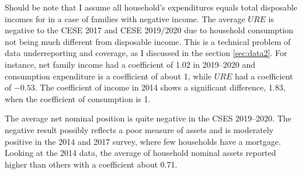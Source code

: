 \documentclass[11pt,letterpaper]{article}
\begin{document}
Should be note that I assume all household's expenditures equals total disposable incomes for in a case of families with negative income. The average $URE$ is negative to the CESE 2017 and CESE 2019/2020 due to household consumption not being much different from disposable income. This is a technical problem of data underreporting and coverage, as I discussed in the section \ref{sec:data2}. For instance, net family income had a coefficient of 1.02 in 2019--2020 and consumption expenditure is a coefficient of about 1, while $URE$ had a coefficient of $-0.53$. The coefficient of income in 2014 shows a significant difference, 1.83, when the coefficient of consumption is 1. 

The average net nominal position is quite negative in the CSES 2019--2020. The negative result possibly reflects a poor measure of assets and is moderately positive in the 2014 and 2017 survey, where few households have a mortgage. Looking at the 2014 data, the average of household nominal assets reported higher than others with a coefficient about 0.71.    
\end{document}
